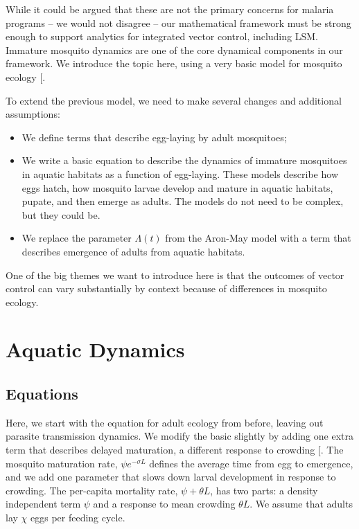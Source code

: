 \documentclass[
]{book}
\begin{document}
While it could be argued that these are not the primary concerns for malaria programs -- we would not disagree -- our mathematical framework must be strong enough to support analytics for integrated vector control, including LSM. Immature mosquito dynamics are one of the core dynamical components in our framework. We introduce the topic here, using a very basic model for mosquito ecology {[}\citeproc{ref-SmithDL2013_LarvalDynamics}{\textbf{SmithDL2013\_LarvalDynamics?}}{]}.

To extend the previous model, we need to make several changes and additional assumptions:

\begin{itemize}
\item
  We define terms that describe egg-laying by adult mosquitoes;
\item
  We write a basic equation to describe the dynamics of immature mosquitoes in aquatic habitats as a function of egg-laying. These models describe how eggs hatch, how mosquito larvae develop and mature in aquatic habitats, pupate, and then emerge as adults. The models do not need to be complex, but they could be.
\item
  We replace the parameter \(\Lambda(t)\) from the Aron-May model with a term that
  describes emergence of adults from aquatic habitats.
\end{itemize}

One of the big themes we want to introduce here is that the outcomes of vector control can vary substantially by context because of differences in mosquito ecology.

\section{Aquatic Dynamics}\label{aquatic-dynamics}

\subsection{Equations}\label{equations-3}

Here, we start with the equation for adult ecology from before, leaving out parasite transmission dynamics. We modify the basic slightly by adding one extra term that describes delayed maturation, a different response to crowding {[}\citeproc{ref-SmithDL2013_LarvalDynamics}{\textbf{SmithDL2013\_LarvalDynamics?}}{]}. The mosquito maturation rate, \(\psi e^{-\sigma L}\) defines the average time from egg to emergence, and we add one parameter that slows down larval development in response to crowding. The per-capita mortality rate, \(\psi  + \theta L\), has two parts: a density independent term \(\psi\) and a response to mean crowding \(\theta L\). We assume that adults lay \(\chi\) eggs per feeding cycle.
\end{document}
